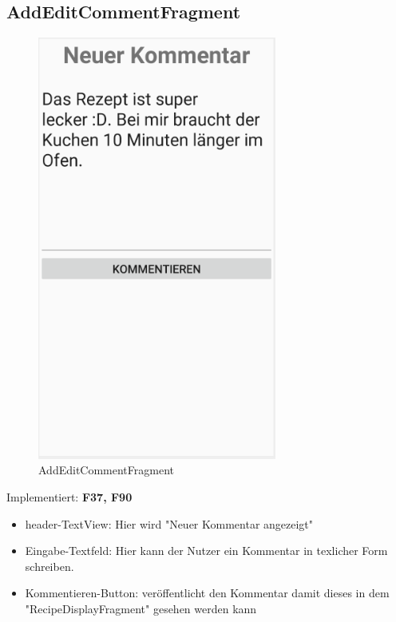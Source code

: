\subsection{AddEditCommentFragment}
\begin{figure}[H]
	\centering
	\includegraphics[width=0.7\textwidth]{pics/addeditCommentFragment.png}%
	\caption{AddEditCommentFragment}%
	\label{view}%
\end{figure}
Implementiert: \textbf{F37, F90}
\begin{itemize}[nosep]
	\item header-TextView: Hier wird "Neuer Kommentar angezeigt"
	\item 	Eingabe-Textfeld: Hier kann der Nutzer ein Kommentar in texlicher Form schreiben.
	\item 	Kommentieren-Button: veröffentlicht den Kommentar damit dieses in dem "RecipeDisplayFragment" gesehen werden kann
\end{itemize}

